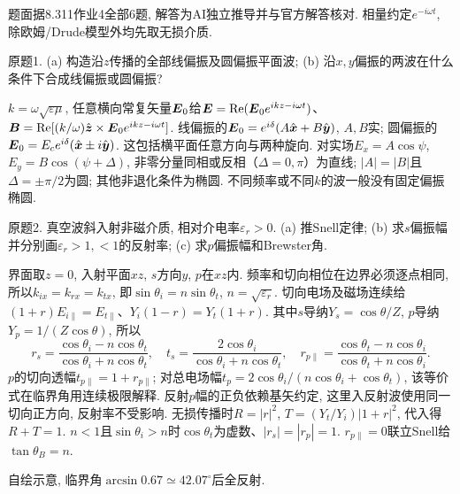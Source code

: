 题面据8.311作业4全部6题, 解答为AI独立推导并与官方解答核对. 相量约定$e^{-i\omega t}$, 除欧姆/Drude模型外均先取无损介质.
\begin{exercise}
原题1. (a) 构造沿$z$传播的全部线偏振及圆偏振平面波; (b) 沿$x,y$偏振的两波在什么条件下合成线偏振或圆偏振?
\end{exercise}
\begin{solution}
$k=\omega\sqrt{\varepsilon\mu}$, 任意横向常复矢量$\boldsymbol{E}_0$给$\boldsymbol{E}=\operatorname{Re}(\boldsymbol{E}_0e^{ikz-i\omega t})$、$\boldsymbol{B}=\operatorname{Re}[(k/\omega)\hat{\boldsymbol{z}}\times\boldsymbol{E}_0e^{ikz-i\omega t}]$. 线偏振的$\boldsymbol{E}_0=e^{i\delta}(A\hat{\boldsymbol{x}}+B\hat{\boldsymbol{y}})$, $A,B$实; 圆偏振的$\boldsymbol{E}_0=E_c e^{i\delta}(\hat{\boldsymbol{x}}\pm i\hat{\boldsymbol{y}})$. 这包括横平面任意方向与两种旋向. 对实场$E_x=A\cos\psi$, $E_y=B\cos(\psi+\Delta)$, 非零分量同相或反相（$\Delta=0,\pi$）为直线; $|A|=|B|$且$\Delta=\pm\pi/2$为圆; 其他非退化条件为椭圆. 不同频率或不同$k$的波一般没有固定偏振椭圆.
\end{solution}
\begin{exercise}
原题2. 真空波斜入射非磁介质, 相对介电率$\varepsilon_r>0$. (a) 推Snell定律; (b) 求$s$偏振幅并分别画$\varepsilon_r>1,<1$的反射率; (c) 求$p$偏振幅和Brewster角.
\end{exercise}
\begin{solution}
界面取$z=0$, 入射平面$xz$, $s$方向$y$, $p$在$xz$内. 频率和切向相位在边界必须逐点相同, 所以$k_{ix}=k_{rx}=k_{tx}$, 即$\sin\theta_i=n\sin\theta_t$, $n=\sqrt{\varepsilon_r}$. 切向电场及磁场连续给$(1+r)E_{i\parallel}=E_{t\parallel}$、$Y_i(1-r)=Y_t(1+r)$. 其中$s$导纳$Y_s=\cos\theta/Z$, $p$导纳$Y_p=1/(Z\cos\theta)$, 所以
\[
 r_s=\frac{\cos\theta_i-n\cos\theta_t}{\cos\theta_i+n\cos\theta_t},\quad
 t_s=\frac{2\cos\theta_i}{\cos\theta_i+n\cos\theta_t},\quad
 r_{p\parallel}=\frac{\cos\theta_t-n\cos\theta_i}{\cos\theta_t+n\cos\theta_i}.
\]
$p$的切向透幅$t_{p\parallel}=1+r_{p\parallel}$; 对总电场幅$t_p=2\cos\theta_i/(n\cos\theta_i+\cos\theta_t)$, 该等价式在临界角用连续极限解释. 反射$p$幅的正负依赖基矢约定, 这里入反射波使用同一切向正方向, 反射率不受影响. 无损传播时$R=|r|^2$, $T=(Y_t/Y_i)|1+r|^2$, 代入得$R+T=1$. $n<1$且$\sin\theta_i>n$时$\cos\theta_t$为虚数、$|r_s|=|r_p|=1$. $r_{p\parallel}=0$联立Snell给$\tan\theta_B=n$.
\begin{center}\par
自绘示意, 临界角$\arcsin0.67\simeq42.07^\circ$后全反射.
\end{center}
\end{solution}

